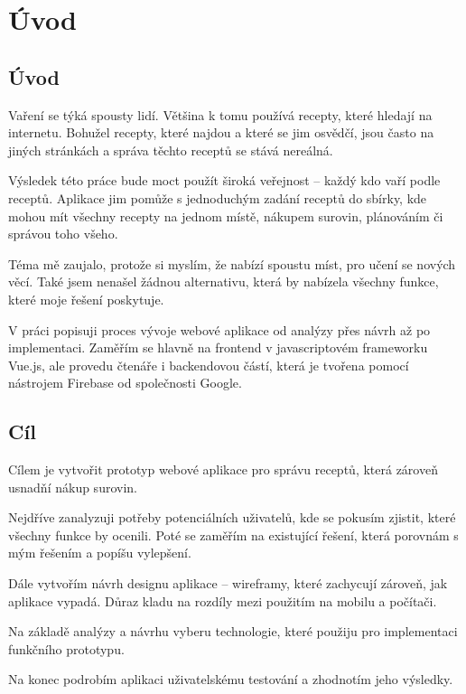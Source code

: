 
\chapter{Úvod}

\section{Úvod}
Vaření se týká spousty lidí. Většina k tomu používá recepty, které hledají na internetu. Bohužel recepty, které najdou
a které se jim osvědčí, jsou často na jiných stránkách a správa těchto receptů se stává nereálná.

Výsledek této práce bude moct použít široká veřejnost -- každý kdo vaří podle receptů. Aplikace jim pomůže s jednoduchým
zadání receptů do sbírky, kde mohou mít všechny recepty na jednom místě, nákupem surovin, plánováním či správou toho všeho.

Téma mě zaujalo, protože si myslím, že nabízí spoustu míst, pro učení se nových věcí. Také jsem nenašel žádnou alternativu,
která by nabízela všechny funkce, které moje řešení poskytuje.

V práci popisuji proces vývoje webové aplikace od analýzy přes návrh až po implementaci. Zaměřím se hlavně na frontend v
javascriptovém frameworku Vue.js, ale provedu čtenáře i backendovou částí, která je tvořena pomocí nástrojem Firebase od
společnosti Google.

\section{Cíl}
Cílem je vytvořit prototyp webové aplikace pro správu receptů, která zároveň usnadňí nákup surovin.

Nejdříve zanalyzuji potřeby potenciálních uživatelů, kde se pokusím zjistit, které všechny funkce by ocenili. Poté se
zaměřím na existující řešení, která porovnám s mým řešením a popíšu vylepšení.

Dále vytvořím návrh designu aplikace -- wireframy, které zachycují zároveň, jak aplikace vypadá. Důraz kladu na rozdíly
mezi použitím na mobilu a počítači.

Na základě analýzy a návrhu vyberu technologie, které použiju pro implementaci funkčního prototypu.

Na konec podrobím aplikaci uživatelskému testování a zhodnotím jeho výsledky.

